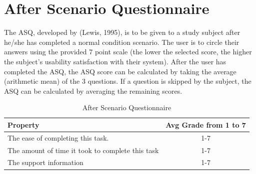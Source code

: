 \section{After Scenario Questionnaire}
The ASQ, developed by (Lewis, 1995), is to be given to a study subject after he/she has completed a normal condition scenario. The user is to circle their answers using the provided 7 point scale (the lower the selected score, the higher the subject’s usability satisfaction with their system). After the user has completed the ASQ, the ASQ score can be calculated by taking the average (arithmetic mean) of the 3 questions. If a question is skipped by the subject, the ASQ can be calculated by averaging the remaining scores.
\begin{table}[h]
	\begin{center}
		\begin{tabular}{| l | c |}
			\hline
			\textbf{Property} & \textbf{Avg Grade from 1 to 7 }\\
			\hline
			The ease of completing this task. & 1-7 \\
			\hline
			The amount of time it took to complete this task & 1-7 \\
			\hline
			The support information  & 1-7\\
			\hline
		\end{tabular}
	\end{center}
	\caption{After Scenario Questionnaire}
\end{table}

